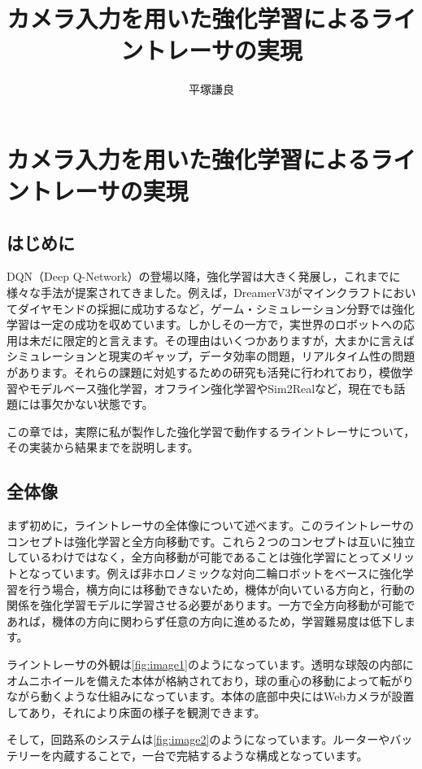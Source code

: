 \documentclass{jsbook}
\title{カメラ入力を用いた強化学習によるライントレーサの実現}
\author{平塚謙良}
\numberwithin{equation}{section}
\begin{document}
\maketitle

\chapter{カメラ入力を用いた強化学習によるライントレーサの実現}

\section{はじめに}
DQN（Deep Q-Network\cite{mnih2013playing}）の登場以降，強化学習は大きく発展し，これまでに様々な手法が提案されてきました。例えば，DreamerV3\cite{hafner2024masteringdiversedomainsworld}がマインクラフトにおいてダイヤモンドの採掘に成功するなど，ゲーム・シミュレーション分野では強化学習は一定の成功を収めています。しかしその一方で，実世界のロボットへの応用は未だに限定的と言えます。その理由はいくつかありますが，大まかに言えばシミュレーションと現実のギャップ，データ効率の問題，リアルタイム性の問題があります。それらの課題に対処するための研究も活発に行われており，模倣学習やモデルベース強化学習，オフライン強化学習やSim2Realなど，現在でも話題には事欠かない状態です。

この章では，実際に私が製作した強化学習で動作するライントレーサについて，その実装から結果までを説明します。

\section{全体像}
まず初めに，ライントレーサの全体像について述べます。このライントレーサのコンセプトは強化学習と全方向移動です。これら２つのコンセプトは互いに独立しているわけではなく，全方向移動が可能であることは強化学習にとってメリットとなっています。例えば非ホロノミックな対向二輪ロボットをベースに強化学習を行う場合，横方向には移動できないため，機体が向いている方向と，行動の関係を強化学習モデルに学習させる必要があります。一方で全方向移動が可能であれば，機体の方向に関わらず任意の方向に進めるため，学習難易度は低下します。

ライントレーサの外観は\ref{fig:image1}のようになっています。透明な球殻の内部にオムニホイールを備えた本体が格納されており，球の重心の移動によって転がりながら動くような仕組みになっています。本体の底部中央にはWebカメラが設置してあり，それにより床面の様子を観測できます。

そして，回路系のシステムは\ref{fig:image2}のようになっています。ルーターやバッテリーを内蔵することで，一台で完結するような構成となっています。
\end{document}
